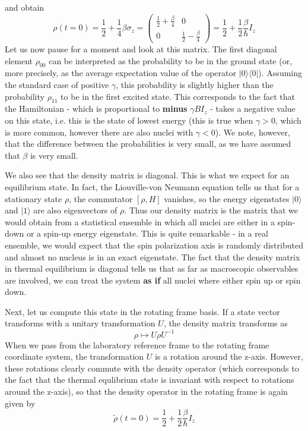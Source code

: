 \documentclass[a4paper, draft]{article}
\theoremstyle{own}
\theoremstyle{remark}
\begin{document}
and obtain
$$
\rho(t=0) = \frac{1}{2} + \frac{1}{4} \beta \sigma_z =
\begin{pmatrix}
\frac{1}{2} + \frac{\beta}{4} & 0 \\
0 & \frac{1}{2} - \frac{\beta}{4}
\end{pmatrix} = \frac{1}{2} + \frac{1}{2} \frac{\beta}{\hbar} I_z
$$
Let us now pause for a moment and look at this matrix. The first diagonal element $\rho_{00}$ can be interpreted as the probability to be in the ground state (or, more precisely, as the average expectation value of the operator $|0 \rangle \langle 0 |$). Assuming the standard case of positive $\gamma$, this probability is slightly higher than the probability $\rho_{11}$ to be in the first excited state. This corresponds to the fact that the Hamiltonian - which is proportional to {\bf minus} $\gamma B I_z$ - takes a negative value on this state, i.e. this is the state of lowest energy (this is true when $\gamma > 0$, which is more common, however there are also nuclei with $\gamma < 0$). We note, however, that the difference between the probabilities is very small, as we have assumed that $\beta$ is very small. 

We also see that the density matrix is diagonal. This is what we expect for an equilibrium state. In fact, the Liouville-von Neumann equation tells us that for a stationary state $\rho$, the commutator $[\rho, H]$ vanishes, so the energy eigenstates $|0 \rangle$ and $|1 \rangle$ are also eigenvectors of $\rho$. Thus our density matrix is the matrix that we would obtain from a statistical ensemble in which all nuclei are either in a spin-down or a spin-up energy eigenstate. This is quite remarkable - in a real ensemble, we would expect that the spin polarization axis is randomly distributed and almost no nucleus is in an exact eigenstate. The fact that the density matrix in thermal equilibrium is diagonal tells us that as far as macroscopic observables are involved, we can treat the system {\bf as if} all nuclei where either spin up or spin down. 

Next, let us compute this state in the rotating frame basis. If a state vector transforms with a unitary transformation $U$, the density matrix transforms as
$$
\rho \mapsto U \rho U^{-1}
$$
When we pass from the laboratory reference frame to the rotating frame coordinate system, the transformation $U$ is a rotation around the z-axis. However, these rotations clearly commute with the density operator (which corresponds to the fact that the thermal equlibrium state is invariant with respect to rotations around the z-axis), so that the density operator in the rotating frame is again given by
$$
\widetilde{\rho} (t=0) = \frac{1}{2} + \frac{1}{2} \frac{\beta}{\hbar} I_z
$$
\end{document}
